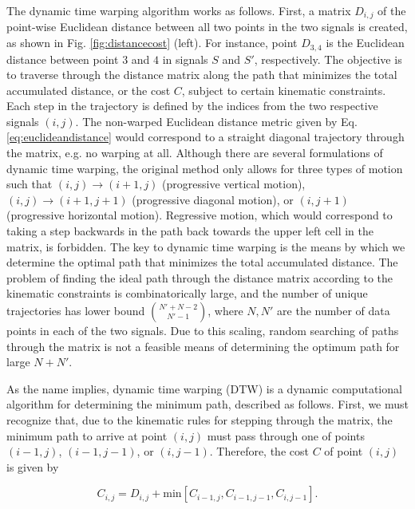 			
			The dynamic time warping algorithm works as follows. First, a matrix $D_{i,j}$ of the point-wise Euclidean distance between all two points in the two signals is created, as shown in Fig. \ref{fig:distancecost} (left). For instance, point $D_{3,4}$ is the Euclidean distance between point $3$ and $4$ in signals $S$ and $S'$, respectively. The objective is to traverse through the distance matrix along the path that minimizes the total accumulated distance, or the cost $C$, subject to certain kinematic constraints. Each step in the trajectory is defined by the indices from the two respective signals $\left(i,j\right)$. The non-warped Euclidean distance metric given by Eq. \ref{eq:euclideandistance} would correspond to a straight diagonal trajectory through the matrix, e.g. no warping at all. Although there are several formulations of dynamic time warping, the original method only allows for three types of motion such that $\left(i,j\right)\rightarrow\left(i+1,j\right)$ (progressive vertical motion), $\left(i,j\right)\rightarrow\left(i+1,j+1\right)$ (progressive diagonal motion), or $\left(i,j+1\right)$ (progressive horizontal motion). Regressive motion, which would correspond to taking a step backwards in the path back towards the upper left cell in the matrix, is forbidden. The key to dynamic time warping is the means by which we determine the optimal path that minimizes the total accumulated distance. The problem of finding the ideal path through the distance matrix according to the kinematic constraints is combinatorically large, and the number of unique trajectories has lower bound ${N'+N-2\choose N'-1}$, where $N, N'$ are the number of data points in each of the two signals. Due to this scaling, random searching of paths through the matrix is not a feasible means of determining the optimum path for large $N+N'$. 
			
			As the name implies, dynamic time warping (DTW) is a dynamic computational algorithm for determining the minimum path, described as follows. First, we must recognize that, due to the kinematic rules for stepping through the matrix, the minimum path to arrive at point $\left(i,j\right)$ must pass through one of points $\left(i-1,j\right)$, $\left(i-1,j-1\right)$, or $\left(i,j-1\right)$. Therefore, the cost $C$ of point $\left(i,j\right)$ is given by
			
			\begin{equation}\label{eq:dtwcost}
			C_{i,j}=D_{i,j}+\mathrm{min}\left[C_{i-1,j}, C_{i-1,j-1}, C_{i,j-1}\right].
			\end{equation}
			
